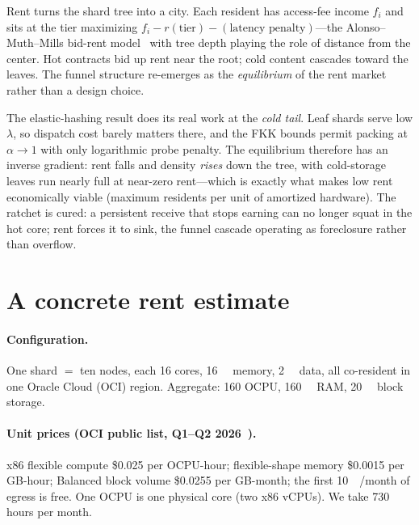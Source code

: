 \documentclass[11pt]{article}
\newcommand{\rent}{r}
\begin{document}
Rent turns the shard tree into a city. Each resident has access-fee income $f_i$ and sits at the tier maximizing $f_i - \rent(\text{tier}) - (\text{latency penalty})$---the Alonso--Muth--Mills bid-rent model~\cite{alonso1964,muth1969,mills1967} with tree depth playing the role of distance from the center. Hot contracts bid up rent near the root; cold content cascades toward the leaves. The funnel structure re-emerges as the \emph{equilibrium} of the rent market rather than a design choice.

The elastic-hashing result does its real work at the \emph{cold tail}. Leaf shards serve low $\lambda$, so dispatch cost barely matters there, and the FKK bounds permit packing at $\alpha\to1$ with only logarithmic probe penalty. The equilibrium therefore has an inverse gradient: rent falls and density \emph{rises} down the tree, with cold-storage leaves run nearly full at near-zero rent---which is exactly what makes low rent economically viable (maximum residents per unit of amortized hardware). The ratchet is cured: a persistent receive that stops earning can no longer squat in the hot core; rent forces it to sink, the funnel cascade operating as foreclosure rather than overflow.

\section{A concrete rent estimate}
\label{sec:estimate}

\paragraph{Configuration.} One shard $=$ ten nodes, each \num{16} cores, \SI{16}{\giga\byte} memory, \SI{2}{\tera\byte} data, all co-resident in one Oracle Cloud (OCI) region. Aggregate: \num{160} OCPU, \SI{160}{\giga\byte} RAM, \SI{20}{\tera\byte} block storage.

\paragraph{Unit prices (OCI public list, Q1--Q2 2026~\cite{oci2026}).} x86 flexible compute \$\num{0.025} per OCPU-hour; flexible-shape memory \$\num{0.0015} per GB-hour; Balanced block volume \$\num{0.0255} per GB-month; the first \SI{10}{\tera\byte}/month of egress is free. One OCPU is one physical core (two x86 vCPUs). We take \num{730} hours per month.
\end{document}
